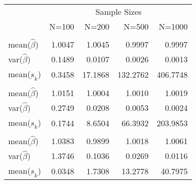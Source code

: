 
\begin{tabular}{lrrrr}
\toprule
\multicolumn{1}{c}{ } & \multicolumn{4}{c}{Sample Sizes} \\
\cmidrule(l{3pt}r{3pt}){2-5}
  & N=100 & N=200 & N=500 & N=1000\\
\midrule
\addlinespace[0.3em]
\multicolumn{5}{l}{\textbf{$ \rho = 0 $  }}\\
\hspace{1em}mean($\hat{\beta}$) & 1.0047 & 1.0045 & 0.9997 & 0.9997\\
\hspace{1em}var($\hat{\beta}$) & 0.1489 & 0.0107 & 0.0026 & 0.0013\\
\hspace{1em}mean($\underbar{s}_k$) & 0.3458 & 17.1868 & 132.2762 & 406.7748\\
\addlinespace[0.3em]
\multicolumn{5}{l}{\textbf{$ \rho = 0.5 $}}\\
\hspace{1em}mean($\hat{\beta}$) & 1.0151 & 1.0004 & 1.0010 & 1.0019\\
\hspace{1em}var($\hat{\beta}$) & 0.2749 & 0.0208 & 0.0053 & 0.0024\\
\hspace{1em}mean($\underbar{s}_k$) & 0.1744 & 8.6504 & 66.3932 & 203.9853\\
\addlinespace[0.3em]
\multicolumn{5}{l}{\textbf{$ \rho = 0.9 $}}\\
\hspace{1em}mean($\hat{\beta}$) & 1.0383 & 0.9899 & 1.0018 & 1.0061\\
\hspace{1em}var($\hat{\beta}$) & 1.3746 & 0.1036 & 0.0269 & 0.0116\\
\hspace{1em}mean($\underbar{s}_k$) & 0.0348 & 1.7308 & 13.2778 & 40.7975\\
\bottomrule
\end{tabular}
